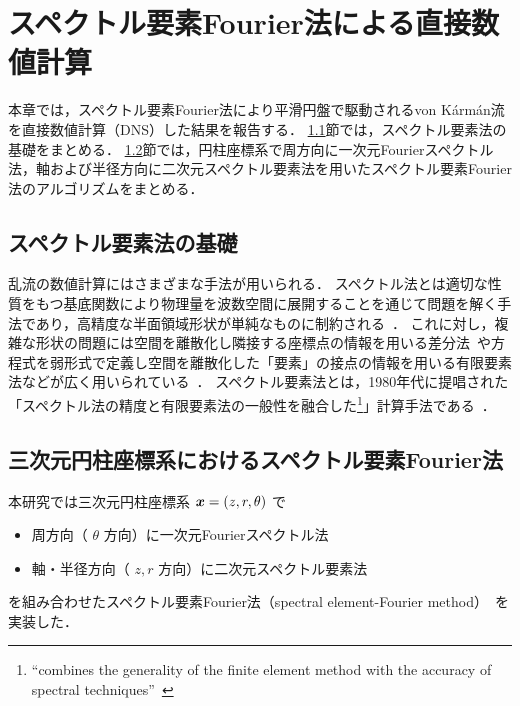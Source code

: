 \chapter{スペクトル要素Fourier法による直接数値計算}
\label{chap:NumericalCalculation}

本章では，スペクトル要素Fourier法により平滑円盤で駆動されるvon K\'arm\'an流を直接数値計算（DNS）した結果を報告する．
\ref{sec:BasisOfSpectralElementMethod}節では，スペクトル要素法の基礎をまとめる．
\ref{sec:SpectralElementFourierMethod}節では，円柱座標系で周方向に一次元Fourierスペクトル法，軸および半径方向に二次元スペクトル要素法を用いたスペクトル要素Fourier法のアルゴリズムをまとめる．


\section{スペクトル要素法の基礎}
\label{sec:BasisOfSpectralElementMethod}

乱流の数値計算にはさまざまな手法が用いられる．
スペクトル法とは適切な性質をもつ基底関数により物理量を波数空間に展開することを通じて問題を解く手法であり，高精度な半面領域形状が単純なものに制約される~\cite{Ishioka_spectral}．
これに対し，複雑な形状の問題には空間を離散化し隣接する座標点の情報を用いる差分法~\cite{Kajishima_turbulence_simulation}や方程式を弱形式で定義し空間を離散化した「要素」の接点の情報を用いる有限要素法などが広く用いられている~\cite{1994fem_mathematics}．
スペクトル要素法とは，1980年代に提唱された「スペクトル法の精度と有限要素法の一般性を融合した\footnote{``combines the generality of the finite element method with the accuracy of spectral techniques''~\cite{Patera1984}}」計算手法である~\cite{karniadakis2005spectral}．


\section{三次元円柱座標系におけるスペクトル要素Fourier法}
\label{sec:SpectralElementFourierMethod}

本研究では三次元円柱座標系 \(\vb*{x} = (z,r,\theta)\) で
\begin{itemize}
  \item 周方向（ \(\theta\) 方向）に一次元Fourierスペクトル法
  \item 軸・半径方向（ \(z,r\) 方向）に二次元スペクトル要素法
\end{itemize}
を組み合わせたスペクトル要素Fourier法（spectral element-Fourier method）~\cite{Karniadakis1991,Blackburn2004}を実装した．

